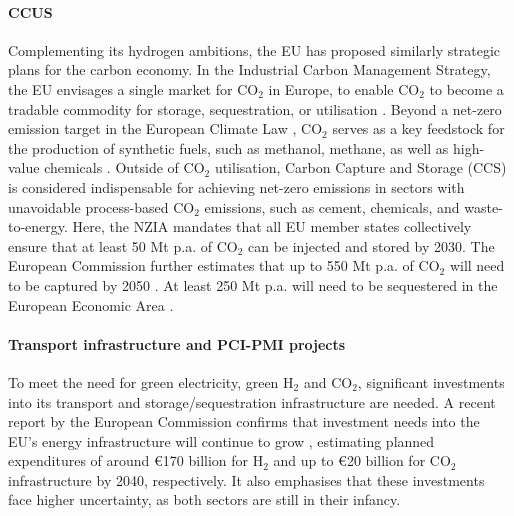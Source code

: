 \documentclass[pdflatex,sn-nature]{sn-jnl}%
\theoremstyle{thmstyleone}%
\theoremstyle{thmstyletwo}%
\theoremstyle{thmstylethree}%
\begin{document}
\paragraph{CCUS}
Complementing its hydrogen ambitions, the EU has proposed similarly strategic plans for the carbon economy. In the Industrial Carbon Management Strategy, the EU envisages a single market for CO$_2$ in Europe, to enable CO$_2$ to become a tradable commodity for storage, sequestration, or utilisation \cite{europeancourtofauditorsEUsIndustrialPolicy2024}. Beyond a net-zero emission target in the European Climate Law \cite{europeanparliamentRegulationEU20212021}, CO$_2$ serves as a key feedstock for the production of synthetic fuels, such as methanol, methane, as well as high-value chemicals \cite{neumannPotentialRoleHydrogen2023}. Outside of CO$_2$ utilisation, Carbon Capture and Storage (CCS) is considered indispensable for achieving net-zero emissions in sectors with unavoidable process-based CO$_2$ emissions, such as cement, chemicals, and waste-to-energy. Here, the NZIA mandates that all EU member states collectively ensure that at least 50 Mt p.a. of CO$_2$ can be injected and stored by 2030. The European Commission further estimates that up to 550 Mt p.a. of CO$_2$ will need to be captured by 2050 \cite{europeanparliamentRegulationEU20242024}. At least 250 Mt p.a. will need to be sequestered in the European Economic Area \cite{europeancommissionCommunicationCommissionEuropean2024}.

\paragraph{Transport infrastructure and PCI-PMI projects}
To meet the need for green electricity, green H$_2$ and CO$_2$, significant investments into its transport and storage/sequestration infrastructure are needed. A recent report by the European Commission confirms that investment needs into the EU's energy infrastructure will continue to grow \cite{europeancommission.directorategeneralforenergy.InvestmentNeedsEuropean2025}, estimating planned expenditures of around €170 billion for H$_2$ and up to €20 billion for CO$_2$ infrastructure by 2040, respectively. It also emphasises that these investments face higher uncertainty, as both sectors are still in their infancy. 
\end{document}
